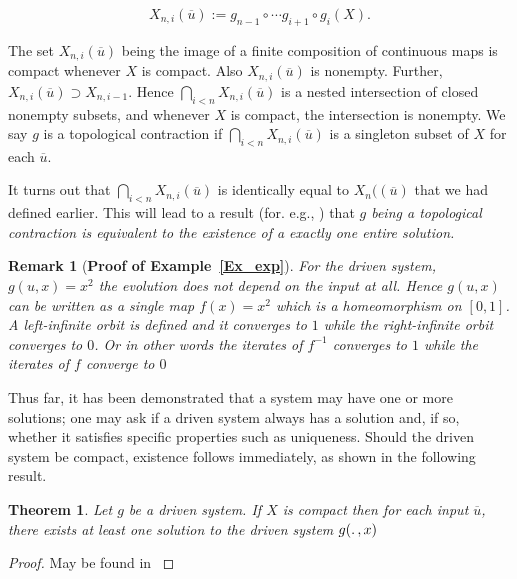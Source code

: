 \documentclass[a4paper,12pt,twoside]{report}
\newtheorem{Definition}{Definition}[]
\newtheorem{Theorem}{Theorem}[]
\newtheorem{Remark}{Remark}[]
\begin{document}
\begin{equation} \label{eqn_association}
X_{n,i}(\overline{u}) := g_{n-1} \circ \cdots g_{i+1} \circ g_i(X).
\end{equation}

The set $X_{n,i}(\overline{u})$ being the image of a finite composition of
continuous maps is compact whenever $X$ is compact. Also $X_{n,i}(\overline{u})$ is
nonempty.  Further, $X_{n,i}(\overline{u}) \supset X_{n,i-1}$. Hence $\bigcap_{i<n}
X_{n,i}(\overline{u})$ is a nested intersection of closed nonempty subsets, and
whenever $X$ is compact, the intersection is nonempty. We say $g$ is a topological contraction if $\bigcap_{i<n}X_{n,i}(\overline{u})$ is a singleton subset of $X$ for each $\overline{u}$. 

It turns out that $\bigcap_{i<n}X_{n,i}(\overline{u})$ is identically equal to $X_n((\overline{u})$ that we had defined earlier. This will lead to a result (for. e.g., \cite{manjunath2013echo}) that  \textit{$g$ being a topological contraction is equivalent to the existence of a exactly one entire solution.}


\begin{Remark}
  [\bf Proof of Example~\ref{Ex_exp}] \label{rem_proofEx} \rm
  For the driven system,  
  $g(u,x)=x^2$ the evolution does not depend on the input at all. Hence $g(u,x)$ can be written as a single map $f(x)=x^2$ which is a homeomorphism on $[0,1]$. A left-infinite orbit is defined and it converges to $1$ while the right-infinite orbit converges to $0$. Or in other words the iterates of $f^{-1}$ converges to $1$ while the iterates of $f$ converge to $0$ 
\end{Remark}

Thus far, it has been demonstrated that a system may have one or more solutions; one may ask if a driven system always has a solution and, if so, whether it satisfies specific properties such as uniqueness. 
Should the driven system be compact, existence follows immediately, as shown in the following result.

\begin{Theorem}\label{Thm_CompactExistence}
 Let $g$ be a driven system.  If $X$ is compact then for each input $\overline{u}$, there exists at least one solution to the driven system $g(\ldotp, x)$
\end{Theorem}
\begin{proof}
  May be found in \cite{kloeden2011nonautonomous, manjunath2014dynamics, manjunath2013echo}
\end{proof}
\end{document}
